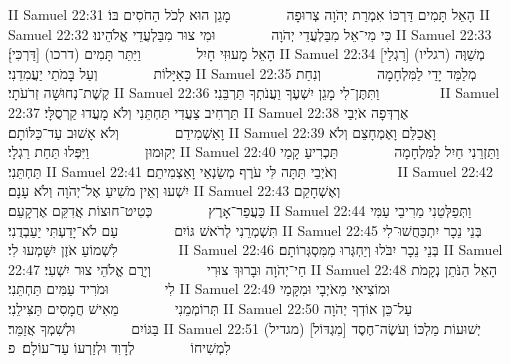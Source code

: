 II Samuel 22:31	הָאֵל תָּמִים דַּרְכּוֹ אִמְרַת יְהֹוָה צְרוּפָה        מָגֵן הוּא לְכֹל הַחֹסִים בּוֹ׃
II Samuel 22:32	כִּי מִי־אֵל מִבַּלְעֲדֵי יְהֹוָה        וּמִי צוּר מִבַּלְעֲדֵי אֱלֹהֵינוּ׃
II Samuel 22:33	הָאֵל מָעוּזִּי חָיִל        וַיַּתֵּר תָּמִים (דרכו) [דַּרְכִּי]׃
II Samuel 22:34	מְשַׁוֶּה (רגליו) [רַגְלַי] כָּאַיָּלוֹת        וְעַל בָּמֹתַי יַעֲמִדֵנִי׃
II Samuel 22:35	מְלַמֵּד יָדַי לַמִּלְחָמָה        וְנִחַת קֶשֶׁת־נְחוּשָׁה זְרֹעֹתָי׃
II Samuel 22:36	וַתִּתֶּן־לִי מָגֵן יִשְׁעֶךָ וַעֲנֹתְךָ תַּרְבֵּנִי׃        
II Samuel 22:37	תַּרְחִיב צַעֲדִי תַּחְתֵּנִי וְלֹא מָעֲדוּ קַרְסֻלָּי׃
II Samuel 22:38	אֶרְדְּפָה אֹיְבַי וָאַשְׁמִידֵם        וְלֹא אָשׁוּב עַד־כַּלּוֹתָם׃
II Samuel 22:39	וָאֲכַלֵּם וָאֶמְחָצֵם וְלֹא יְקוּמוּן        וַיִּפְּלוּ תַּחַת רַגְלָי׃
II Samuel 22:40	וַתַּזְרֵנִי חַיִל לַמִּלְחָמָה        תַּכְרִיעַ קָמַי תַּחְתֵּנִי׃
II Samuel 22:41	וְאֹיְבַי תַּתָּה לִּי עֹרֶף מְשַׂנְאַי וָאַצְמִיתֵם׃        
II Samuel 22:42	יִשְׁעוּ וְאֵין מֹשִׁיעַ אֶל־יְהֹוָה וְלֹא עָנָם׃
II Samuel 22:43	וְאֶשְׁחָקֵם כַּעֲפַר־אָרֶץ        כְּטִיט־חוּצוֹת אֲדִקֵּם אֶרְקָעֵם׃
II Samuel 22:44	וַתְּפַלְּטֵנִי מֵרִיבֵי עַמִּי תִּשְׁמְרֵנִי לְרֹאשׁ גּוֹיִם        עַם לֹא־יָדַעְתִּי יַעַבְדֻנִי׃
II Samuel 22:45	בְּנֵי נֵכָר יִתְכַּחֲשׁוּ־לִי לִשְׁמוֹעַ אֹזֶן יִשָּׁמְעוּ לִי׃        
II Samuel 22:46	בְּנֵי נֵכָר יִבֹּלוּ וְיַחְגְּרוּ מִמִּסְגְּרוֹתָם׃
II Samuel 22:47	חַי־יְהֹוָה וּבָרוּךְ צוּרִי        וְיָרֻם אֱלֹהֵי צוּר יִשְׁעִי׃
II Samuel 22:48	הָאֵל הַנֹּתֵן נְקָמֹת לִי        וּמֹרִיד עַמִּים תַּחְתֵּנִי׃
II Samuel 22:49	וּמוֹצִיאִי מֵאֹיְבָי וּמִקָּמַי תְּרוֹמְמֵנִי        מֵאִישׁ חֲמָסִים תַּצִּילֵנִי׃
II Samuel 22:50	עַל־כֵּן אוֹדְךָ יְהֹוָה בַּגּוֹיִם        וּלְשִׁמְךָ אֲזַמֵּר׃
II Samuel 22:51	(מגדיל) [מִגְדּוֹל] יְשׁוּעוֹת מַלְכּוֹ וְעֹשֶׂה־חֶסֶד לִמְשִׁיחוֹ        לְדָוִד וּלְזַרְעוֹ עַד־עוֹלָם׃ {פ}
